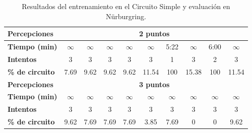 \begin{table}[ht!]
\begin{tabular}{|l|c|c|c|c|c|c|c|c|c|}
\rowcolor[HTML]{EFEFEF} 
\textbf{Percepciones}                           & \multicolumn{9}{c|}{\cellcolor[HTML]{EFEFEF}\textbf{2 puntos}}                                                                                                                                                           \\ \hline
\rowcolor[HTML]{FFFFFF} 
\cellcolor[HTML]{EFEFEF}\textbf{Tiempo (min)}            & $\infty$     & $\infty$     & $\infty$                       & $\infty$     & $\infty$     & 5:22                          & $\infty$                      & 6:00                        & $\infty$                      \\ \hline
\rowcolor[HTML]{FFFFFF} 
\cellcolor[HTML]{EFEFEF}\textbf{Intentos}                & 3            & 3            & 3                              & 3            & 3            & 1                             & 3                             & 2                           & 3                             \\ \hline
\rowcolor[HTML]{FFC702} 
\cellcolor[HTML]{EFEFEF}\textbf{\% de circuito}          & 7.69         & 9.62         & 9.62                           & 9.62         & 11.54        & \cellcolor[HTML]{32CB00}100   & 15.38                         & \cellcolor[HTML]{32CB00}100 & 11.54                         \\ \hline
\rowcolor[HTML]{EFEFEF} 
\textbf{Percepciones}                                    & \multicolumn{9}{c|}{\cellcolor[HTML]{EFEFEF}\textbf{3 puntos}}                                                                                                                                                           \\ \hline
\rowcolor[HTML]{FFFFFF} 
\cellcolor[HTML]{EFEFEF}\textbf{Tiempo (min)}   & $\infty$     & $\infty$     & $\infty$                       & $\infty$     & $\infty$     & $\infty$                      & $\infty$                      & $\infty$                    & $\infty$                      \\ \hline
\rowcolor[HTML]{FFFFFF} 
\cellcolor[HTML]{EFEFEF}\textbf{Intentos}       & 3            & 3            & 3                              & 3            & 3            & 3                             & 3                             & 3                           & 3                             \\ \hline
\rowcolor[HTML]{FFC702} 
\cellcolor[HTML]{EFEFEF}\textbf{\% de circuito} & 9.62         & 7.69         & 7.69                           & 7.69         & 3.85         & 7.69                          & 0                             & 0                           & 9.62                          \\ \hline
\end{tabular}
\caption{Resultados del entrenamiento en el Circuito Simple y evaluación en Nürburgring.}
\label{tab:entrenamiento-simple-evaluacion-nurbur}
\end{table}


